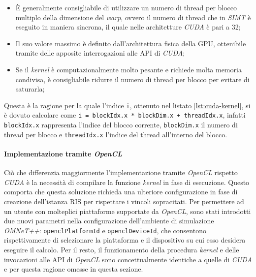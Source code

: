 \begin{itemize}
  \item È generalmente consigliabile di utilizzare un numero di thread per blocco
    multiplo della dimensione del \textit{warp}, ovvero il numero di thread che in
    \textit{SIMT} è eseguito in maniera sincrona, il quale nelle architetture \textit{CUDA}
    è pari a 32;

  \item Il suo valore massimo è definito dall'architettura fisica della GPU,
    ottenibile tramite delle apposite interrogazioni alle API di \textit{CUDA};

  \item Se il \textit{kernel} è computazionalmente molto pesante e richiede
    molta memoria condivisa, è consigliabile ridurre il numero di thread per blocco
    per evitare di saturarla;
\end{itemize}

Questa è la ragione per la quale l'indice \texttt{i}, ottenuto nel listato \ref{lst:cuda-kernel},
si è dovuto calcolare come \texttt{i = blockIdx.x * blockDim.x + threadIdx.x},
infatti \texttt{blockIdx.x} rappresenta l'indice del blocco corrente, \texttt{blockDim.x}
il numero di thread per blocco e \texttt{threadIdx.x} l'indice del thread all'interno
del blocco.

\paragraph{Implementazione tramite \textit{OpenCL}}
\label{para:opencl}

Ciò che differenzia maggiormente l'implementazione tramite \textit{OpenCL} rispetto
\textit{CUDA} è la necessità di compilare la funzione \textit{kernel} in fase di
esecuzione. Questo comporta che questa soluzione richieda una ulteriore
configurazione in fase di creazione dell'istanza RIS per rispettare i vincoli
sopracitati. Per permettere ad un utente con molteplici piattaforme supportate da
\textit{OpenCL}, sono stati introdotti due nuovi parametri nella configurazione dell'ambiente
di simulazione \textit{OMNeT++}: \texttt{openclPlatformId} e \texttt{openclDeviceId},
che consentono rispettivamente di selezionare la piattaforma e il dispositivo su
cui esso desidera eseguire il calcolo. Per il resto, il funzionamento della
procedura \textit{kernel} e delle invocazioni alle API di \textit{OpenCL} sono
concettualmente identiche a quelle di \textit{CUDA} e per questa ragione omesse in
questa sezione.

